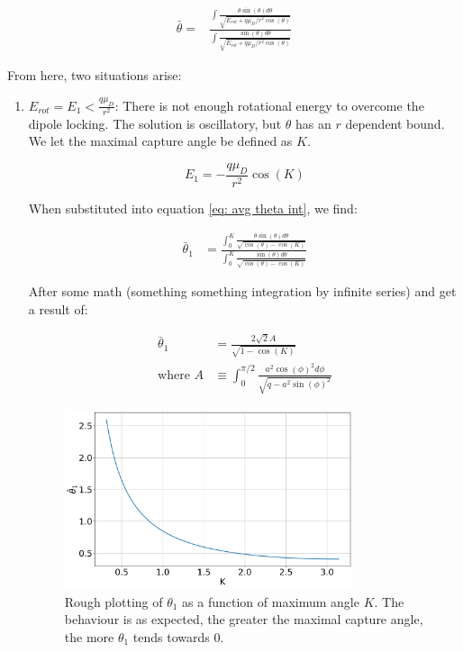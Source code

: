 \begin{align}
    \bar{\theta} = & \frac{\int\frac{\theta \sin(\theta)d\theta}{\sqrt{E_{rot}+q\mu_D/r^2 \cos(\theta)}}}{\int\frac{\sin(\theta)d\theta}{\sqrt{E_{rot}+q\mu_D/r^2 \cos(\theta)}}} \label{eq: avg theta int}
\end{align}

From here, two situations arise:

\begin{enumerate}
	\item $E_{rot} = E_1 < \frac{q \mu_D}{r^2}$:
	There is not enough rotational energy to overcome the dipole locking. The solution is oscillatory, but $\theta$ has an $r$ dependent bound. We let the maximal capture angle be defined as $K$.

	$$ E_1=-\frac{q \mu_D}{r^2}\cos(K) $$

	When substituted into equation \ref{eq: avg theta int}, we find:

	\begin{align*}
	    \bar{\theta}_1 & = \frac{\int_0^K \frac{\theta \sin(\theta) d \theta}{\sqrt{\cos(\theta) - \cos(K)}}}{\int_0^K \frac{\sin(\theta) d \theta}{\sqrt{\cos(\theta) - \cos(K)}}}
	\end{align*}


	After some math (something something integration by infinite series) and get a result of:

	\begin{align*}
	    \bar{\theta}_1 & = \frac{2 \sqrt{2}A}{\sqrt{1-\cos(K)}} \\
	    \text{where }A & \equiv \int_0^{\pi/2} \frac{a^2 \cos(\phi)^2 d\phi}{\sqrt{q-a^2 \sin(\phi)^2}}
	\end{align*}

	\begin{figure}[H]
		\label{fig: theta1}
		\centering
		\includegraphics[width=0.8\textwidth]{images/ADO_theta1.png}
		\caption{Rough plotting of $\theta_1$ as a function of maximum angle $K$. The behaviour is as expected, the greater the maximal capture angle, the more $\theta_1$ tends towards 0.}
	\end{figure}


\end{enumerate}

